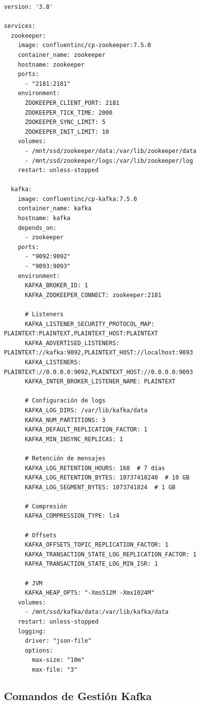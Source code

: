 \begin{verbatim}
version: '3.8'

services:
  zookeeper:
    image: confluentinc/cp-zookeeper:7.5.0
    container_name: zookeeper
    hostname: zookeeper
    ports:
      - "2181:2181"
    environment:
      ZOOKEEPER_CLIENT_PORT: 2181
      ZOOKEEPER_TICK_TIME: 2000
      ZOOKEEPER_SYNC_LIMIT: 5
      ZOOKEEPER_INIT_LIMIT: 10
    volumes:
      - /mnt/ssd/zookeeper/data:/var/lib/zookeeper/data
      - /mnt/ssd/zookeeper/logs:/var/lib/zookeeper/log
    restart: unless-stopped

  kafka:
    image: confluentinc/cp-kafka:7.5.0
    container_name: kafka
    hostname: kafka
    depends_on:
      - zookeeper
    ports:
      - "9092:9092"
      - "9093:9093"
    environment:
      KAFKA_BROKER_ID: 1
      KAFKA_ZOOKEEPER_CONNECT: zookeeper:2181
      
      # Listeners
      KAFKA_LISTENER_SECURITY_PROTOCOL_MAP: PLAINTEXT:PLAINTEXT,PLAINTEXT_HOST:PLAINTEXT
      KAFKA_ADVERTISED_LISTENERS: PLAINTEXT://kafka:9092,PLAINTEXT_HOST://localhost:9093
      KAFKA_LISTENERS: PLAINTEXT://0.0.0.0:9092,PLAINTEXT_HOST://0.0.0.0:9093
      KAFKA_INTER_BROKER_LISTENER_NAME: PLAINTEXT
      
      # Configuración de logs
      KAFKA_LOG_DIRS: /var/lib/kafka/data
      KAFKA_NUM_PARTITIONS: 3
      KAFKA_DEFAULT_REPLICATION_FACTOR: 1
      KAFKA_MIN_INSYNC_REPLICAS: 1
      
      # Retención de mensajes
      KAFKA_LOG_RETENTION_HOURS: 168  # 7 días
      KAFKA_LOG_RETENTION_BYTES: 10737418240  # 10 GB
      KAFKA_LOG_SEGMENT_BYTES: 1073741824  # 1 GB
      
      # Compresión
      KAFKA_COMPRESSION_TYPE: lz4
      
      # Offsets
      KAFKA_OFFSETS_TOPIC_REPLICATION_FACTOR: 1
      KAFKA_TRANSACTION_STATE_LOG_REPLICATION_FACTOR: 1
      KAFKA_TRANSACTION_STATE_LOG_MIN_ISR: 1
      
      # JVM
      KAFKA_HEAP_OPTS: "-Xms512M -Xmx1024M"
    volumes:
      - /mnt/ssd/kafka/data:/var/lib/kafka/data
    restart: unless-stopped
    logging:
      driver: "json-file"
      options:
        max-size: "10m"
        max-file: "3"
\end{verbatim}

\subsection{Comandos de Gestión Kafka}

